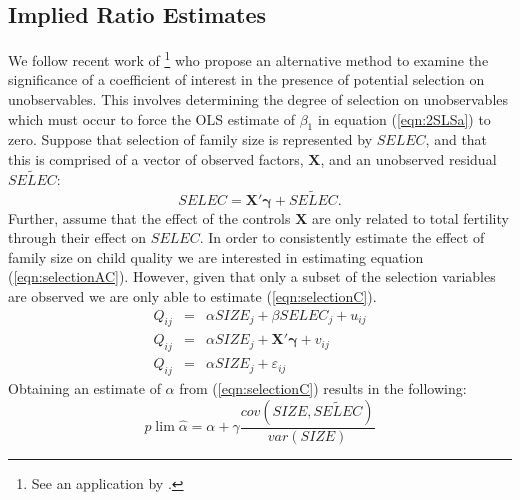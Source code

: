 \documentclass{article}[11pt,subeqn]
\newcommand{\vect}[1]{\mathbf{#1}}
\begin{document}
\begin{spacing}{1.5}


\section{Implied Ratio Estimates}
\label{scn:selection}
We follow recent work of \citet{Altonjietal2005, Altonjietal2008}\footnote{See an application by \citet{BellowsMiguel2008}.} who propose an alternative method to examine the significance of a coefficient of interest in the presence of 
potential selection on unobservables.  This involves determining the degree of selection on unobservables which must occur to force the OLS estimate of $\beta_1$ in equation 
(\ref{eqn:2SLSa}) to zero.  %
Suppose that selection of family size is represented by $SELEC$, and that this is comprised of a vector of observed factors, $\vect{X}$, and an unobserved residual $\widetilde{SELEC}$:  %
\begin{equation}
SELEC=\vect{X'\gamma}+ \widetilde{SELEC}.
\end{equation}
Further, assume that the effect of the controls $\vect{X}$ are only related to total fertility through their effect on $SELEC$.   In order to consistently estimate the effect of 
family size on child quality we are interested in estimating equation 
(\ref{eqn:selectionAC}).  However, given that only a subset of the selection variables are observed we are only able to estimate (\ref{eqn:selectionC}).
\begin{subequations}
\label{eqn:selection}
\begin{eqnarray}
Q_{ij}&=&\alpha SIZE_{j}+\beta SELEC_j+u_{ij} \label{eqn:selectionAC}\\
Q_{ij}&=&\alpha SIZE_{j}+\vect{X'\gamma}+v_{ij} \label{eqn:selectionC}\\
Q_{ij}&=&\alpha SIZE_{j}+\varepsilon_{ij} \label{eqn:selectionNC}
\end{eqnarray}
\end{subequations}
Obtaining an estimate of $\alpha$ from (\ref{eqn:selectionC}) results in the following:
\begin{equation}
\label{eqn:biasC}
 p\lim \hat\alpha=\alpha + \gamma\frac{cov(SIZE,\widetilde{SELEC})}{var(SIZE)}
\end{equation}

\end{spacing}
\end{document}
